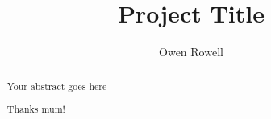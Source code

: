 \documentclass[a4paper, twoside]{article}
\title{Project Title}
\author{Owen Rowell}
\numberwithin{equation}{section}
\begin{document}


\begin{abstract}
Your abstract goes here
\end{abstract}

\renewcommand{\abstractname}{Acknowledgements}
\begin{abstract}
Thanks mum!
\end{abstract}

\tableofcontents
\listoffigures
\listoftables

\printbibliography
\end{document}
